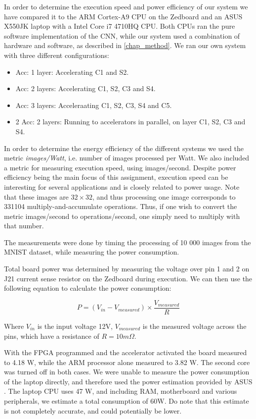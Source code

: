 In order to determine the execution speed and power efficiency of our system we have compared it to the ARM Cortex-A9 CPU on the Zedboard and an ASUS X550JK laptop with a Intel Core i7 4710HQ CPU. Both CPUs ran the pure software implementation of the CNN, while our system used a combination of hardware and software, as described in \ref{chap_method}. We ran our own system with three different configurations:

\begin{itemize}
\item Acc: 1 layer: Accelerating C1 and S2.
\item Acc: 2 layers: Accelerating C1, S2, C3 and S4.
\item Acc: 3 layers: Acceleraating C1, S2, C3, S4 and C5.
\item 2 Acc: 2 layers: Running to accelerators in parallel, on layer C1, S2, C3 and S4.
\end{itemize}

In order to determine the energy efficiency of the different systems we used the metric \textit{images/Watt}, i.e. number of images processed per Watt. We also included a metric for measuring execution speed, using images/second. Despite power efficiency being the main focus of this assignment, execution speed can be interesting for several applications and is closely related to power usage. Note that these images are $ 32 \times 32 $, and thus processing one image corresponds to 331104 multiply-and-accumulate operations. Thus, if one wish to convert the metric images/second to operations/second, one simply need to multiply with that number.

The measurements were done by timing the processing of 10 000 images from the MNIST dataset, while measuring the power consumption. 

Total board power was determined by measuring the voltage over pin 1 and 2 on J21 current sense resistor on the Zedboard during execution. We can then use the following equation to calculate the power consumption:

\begin{equation}\label{eq_power_measurement}
 P = (V_{in}-V_{measured}) \times \frac{V_{measured}}{R}
\end{equation}

Where $ V_{in} $ is the input voltage 12V, $ V_{measured} $ is the measured voltage across the pins, which have a resistance of $ R = 10m\Omega $.

With the FPGA programmed and the accelerator activated the board measured to 4.18 W, while the ARM processor alone measured to 3.82 W. The second core was turned off in both cases. We were unable to measure the power consumption of the laptop directly, and therefore used the power estimation provided by ASUS \cite{ASUS2015}. The laptop CPU uses 47 W, and including RAM, motherboard and various peripherals, we estimate a total consumption of 60W. Do note that this estimate is not completely accurate, and could potentially be lower. 


